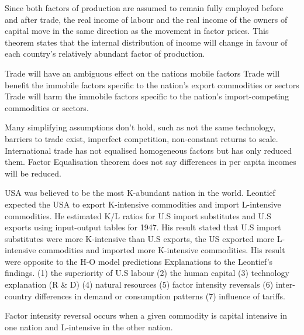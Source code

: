 \documentclass[12pt]{examnotes}
\begin{document}
\ra Since both factors of production are assumed to remain fully employed before and after trade, the real income of labour and the real income of the owners of capital move in the same direction as the movement in factor prices.
\ra This theorem states that the internal distribution of income will change in favour of each country's relatively abundant factor of production.

\ra Trade will have an ambiguous effect on the nations mobile factors
\ra Trade will benefit the immobile factors specific to the nation's export commodities or sectors
\ra Trade will harm the immobile factors specific to the nation's import-competing commodities or sectors.

\ra Many simplifying assumptions don't hold, such as not the same technology, barriers to trade exist, imperfect competition, non-constant returns to scale.
\ra International trade has not equalised homogeneous factors but has only reduced them.
\ra Factor Equalisation theorem does not say differences in per capita incomes will be reduced.

\ra USA was believed to be the most K-abundant nation in the world. Leontief expected the USA to export K-intensive commodities and import L-intensive commodities. 
\ra He estimated K/L ratios for U.S import substitutes and U.S exports using input-output tables for 1947. 
\ra His result stated that U.S import substitutes were more K-intensive than U.S exports, the US  exported more L-intensive commodities and imported more K-intensive commodities. 
\ra His result were opposite to the H-O model predictions
\ra Explanations to the Leontief’s findings.  
(1) the superiority of U.S labour
(2) the human capital
(3) technology explanation (R \& D)
(4) natural resources
(5) factor intensity reversals
(6) inter-country differences in demand or consumption patterns
(7) influence of tariffs.

Factor intensity reversal occurs when a given commodity is capital intensive in one nation and L-intensive in the other nation.
\end{document}
